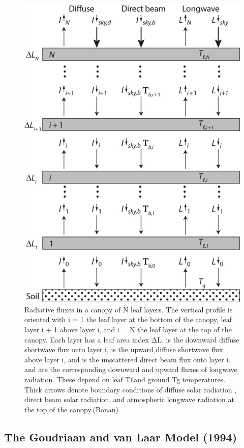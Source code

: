 \documentclass[12pt,oneside]{book}
\begin{document}
\begin{figure}

{\centering \includegraphics[width=0.8\linewidth]{figures/chap3/f319_Norman} 

}

\caption{Radiative fluxes in a canopy of N leaf layers. The vertical profile is oriented with i = 1 the leaf layer at the bottom of the canopy, leaf layer i + 1 above layer i, and i = N the leaf layer at the top of the canopy. Each layer has a leaf area index ΔL. is the downward diffuse shortwave flux onto layer i, is the upward diffuse shortwave flux above layer i, and is the unscattered direct beam flux onto layer i. and are the corresponding downward and upward fluxes of longwave radiation. These depend on leaf Tℓand ground Tg temperatures. Thick arrows denote boundary conditions of diffuse solar radiation , direct beam solar radiation, and atmospheric longwave radiation at the top of the canopy.(Bonan)}\label{fig:f319}
\end{figure}

\subsection{The Goudriaan and van Laar Model
(1994)}\label{the-goudriaan-and-van-laar-model-1994}
\end{document}
